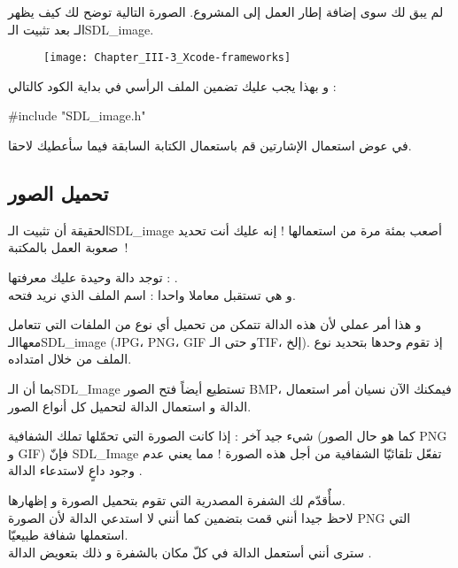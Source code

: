 لم يبق لك سوى إضافة إطار العمل إلى المشروع. الصورة التالية توضح لك كيف يظهر\\
الـ
بعد تثبيت الـ\textenglish{SDL\_image}.

\begin{figure}[H]
	\centering
	\texttt{[image: Chapter\_III-3\_Xcode-frameworks]}
\end{figure}

و بهذا يجب عليك تضمين الملف الرأسي في بداية الكود كالتالي :
\begin{Csource}
#include "SDL_image.h"
\end{Csource}
في عوض استعمال الإشارتين
\InlineCode{< >}
 قم باستعمال الكتابة السابقة فيما سأعطيك لاحقا.

\subsection{تحميل الصور}

الحقيقة أن تثبيت الـ\textenglish{SDL\_image}
أصعب بمئة مرة من استعمالها ! إنه عليك أنت تحديد صعوبة العمل بالمكتبة~! 

توجد دالة وحيدة عليك معرفتها : 
.\\
و هي تستقبل معاملا واحدا : اسم الملف الذي نريد فتحه.

و هذا أمر عملي لأن هذه الدالة تتمكن من تحميل أي نوع من الملفات التي تتعامل معهاالـ\textenglish{SDL\_image}
(\textenglish{JPG}، \textenglish{PNG}، \textenglish{GIF}
و حتى الـ\textenglish{TIF}،
إلخ). إذ تقوم وحدها بتحديد نوع الملف من خلال امتداده.
\begin{question}
بما أن الـ\textenglish{SDL\_Image}
تستطيع أيضاً فتح الصور 
\textenglish{BMP}،
فيمكنك الآن نسيان أمر استعمال الدالة 
و استعمال الدالة 
لتحميل كل أنواع الصور.
\end{question}

شيء جيد آخر : إذا كانت الصورة التي تحمّلها تملك الشفافية (كما هو حال الصور 
\textenglish{PNG}
و
\textenglish{GIF})
 فإنّ
\textenglish{SDL\_Image}
تفعّل تلقائيّا الشفافية من أجل هذه الصورة ! مما يعني عدم وجود داعٍ لاستدعاء الدالة 
.

سأٌقدّم لك الشفرة المصدرية التي تقوم بتحميل الصورة 
و إظهارها.\\
لاحظ جيدا أنني قمت بتضمين
كما أنني لا استدعي الدالة 
لأن الصورة
\textenglish{PNG}
التي استعملها شفافة طبيعيّا.\\
سترى أنني أستعمل الدالة 
في كلّ مكان بالشفرة و ذلك بتعويض الدالة 
.

